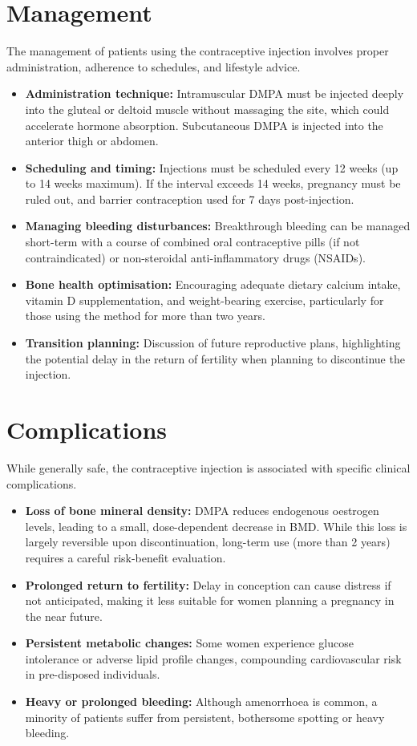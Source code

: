\section*{Management}
The management of patients using the contraceptive injection involves proper administration, adherence to schedules, and lifestyle advice.
\begin{itemize}
    \item \textbf{Administration technique:} Intramuscular DMPA must be injected deeply into the gluteal or deltoid muscle without massaging the site, which could accelerate hormone absorption. Subcutaneous DMPA is injected into the anterior thigh or abdomen.
    \item \textbf{Scheduling and timing:} Injections must be scheduled every 12 weeks (up to 14 weeks maximum). If the interval exceeds 14 weeks, pregnancy must be ruled out, and barrier contraception used for 7 days post-injection.
    \item \textbf{Managing bleeding disturbances:} Breakthrough bleeding can be managed short-term with a course of combined oral contraceptive pills (if not contraindicated) or non-steroidal anti-inflammatory drugs (NSAIDs).
    \item \textbf{Bone health optimisation:} Encouraging adequate dietary calcium intake, vitamin D supplementation, and weight-bearing exercise, particularly for those using the method for more than two years.
    \item \textbf{Transition planning:} Discussion of future reproductive plans, highlighting the potential delay in the return of fertility when planning to discontinue the injection.
\end{itemize}

\section*{Complications}
While generally safe, the contraceptive injection is associated with specific clinical complications.
\begin{itemize}
    \item \textbf{Loss of bone mineral density:} DMPA reduces endogenous oestrogen levels, leading to a small, dose-dependent decrease in BMD. While this loss is largely reversible upon discontinuation, long-term use (more than 2 years) requires a careful risk-benefit evaluation.
    \item \textbf{Prolonged return to fertility:} Delay in conception can cause distress if not anticipated, making it less suitable for women planning a pregnancy in the near future.
    \item \textbf{Persistent metabolic changes:} Some women experience glucose intolerance or adverse lipid profile changes, compounding cardiovascular risk in pre-disposed individuals.
    \item \textbf{Heavy or prolonged bleeding:} Although amenorrhoea is common, a minority of patients suffer from persistent, bothersome spotting or heavy bleeding.
\end{itemize}

